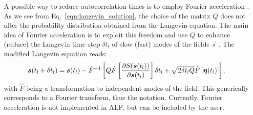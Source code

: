 A possible way to reduce autocorrelation times is to employ Fourier acceleration \cite{Batrouni85,Batrouni19}. As we see from Eq.~\eqref{eqn:langevin_solution}, the choice of the matrix $Q$ does not alter the probability distribution obtained from the Langevin equation. The main idea of Fourier acceleration is to exploit this freedom and use $Q$ to enhance  (reduce) the Langevin time step $\delta t_l$ of slow (fast) modes of the fields $\vec{s}$ \cite{Davies86}. The modified Langevin equation reads:
\begin{equation}
   \boldsymbol{s}(t_{l} +  \delta t_{l})    =    \boldsymbol{s}(t_{l})    - \hat{F}^{-1} \left[ Q \hat{F}\left[\frac{\partial S( \boldsymbol{s}(t_{l})) }{\partial    \boldsymbol{s}(t_{l}) } \right]   \delta t_{l}     +\sqrt{2 \delta t_{l} Q} \hat{F}\left[\boldsymbol{\eta}(t_{l})\right] \right],
\end{equation}
with $\hat{F}$ being a transformation to independent modes of the field. This generically corresponds to a Fourier transform, thus the notation. Currently, Fourier acceleration is not implemented in ALF, but can be included by the user.

